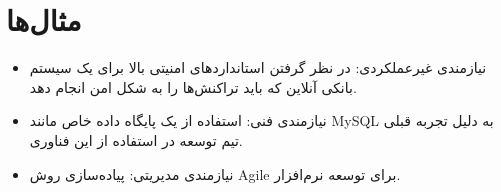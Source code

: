 \section*{مثال‌ها}
\begin{itemize}
	\item نیازمندی غیرعملکردی: در نظر گرفتن استانداردهای امنیتی بالا برای یک سیستم بانکی آنلاین که باید تراکنش‌ها را به شکل امن انجام دهد.
	
	\item نیازمندی فنی: استفاده از یک پایگاه داده خاص مانند MySQL به دلیل تجربه قبلی تیم توسعه در استفاده از این فناوری.
	
	\item نیازمندی مدیریتی: پیاده‌سازی روش Agile برای توسعه نرم‌افزار.
\end{itemize}